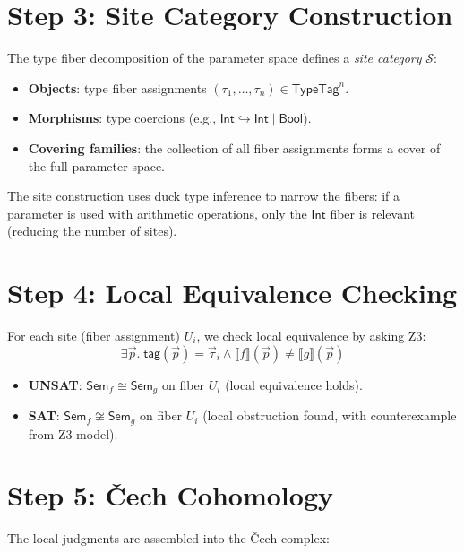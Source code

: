 \documentclass[11pt,a4paper]{report}
\theoremstyle{definition}
\theoremstyle{plain}
\newcommand{\den}[1]{\llbracket #1 \rrbracket}     %
\newcommand{\iso}{\cong}
\newcommand{\Sem}{\mathsf{Sem}}
\newcommand{\site}{\mathcal{S}}
\begin{document}
\section{Step 3: Site Category Construction}

The type fiber decomposition of the parameter space defines a
\emph{site category} $\site$:

\begin{itemize}
  \item \textbf{Objects}: type fiber assignments
    $(\tau_1, \ldots, \tau_n) \in \mathsf{TypeTag}^n$.
  \item \textbf{Morphisms}: type coercions (e.g., $\mathsf{Int}
    \hookrightarrow \mathsf{Int} \mid \mathsf{Bool}$).
  \item \textbf{Covering families}: the collection of all fiber
    assignments forms a cover of the full parameter space.
\end{itemize}

The site construction uses duck type inference to narrow the fibers:
if a parameter is used with arithmetic operations, only the
$\mathsf{Int}$ fiber is relevant (reducing the number of sites).

\section{Step 4: Local Equivalence Checking}

For each site (fiber assignment) $U_i$, we check local equivalence
by asking Z3:
\[
  \exists \vec{p}.\; \mathsf{tag}(\vec{p}) = \vec{\tau}_i \land
  \den{f}(\vec{p}) \neq \den{g}(\vec{p})
\]

\begin{itemize}
  \item \textbf{UNSAT}: $\Sem_f \iso \Sem_g$ on fiber $U_i$
    (local equivalence holds).
  \item \textbf{SAT}: $\Sem_f \not\iso \Sem_g$ on fiber $U_i$
    (local obstruction found, with counterexample from Z3 model).
\end{itemize}

\section{Step 5: \v{C}ech Cohomology}

The local judgments are assembled into the \v{C}ech complex:
\end{document}

